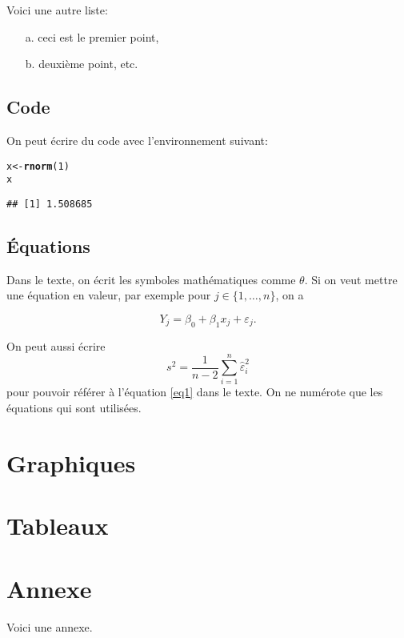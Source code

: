 \documentclass{article}\usepackage[]{graphicx}\usepackage[]{color}
\makeatletter
\newcommand{\hlnum}[1]{\textcolor[rgb]{0.686,0.059,0.569}{#1}}%
\newcommand{\hlstd}[1]{\textcolor[rgb]{0.345,0.345,0.345}{#1}}%
\newcommand{\hlkwb}[1]{\textcolor[rgb]{0.69,0.353,0.396}{#1}}%
\newcommand{\hlkwd}[1]{\textcolor[rgb]{0.737,0.353,0.396}{\textbf{#1}}}%
\newenvironment{kframe}{%
 \def\at@end@of@kframe{}%
 \ifinner\ifhmode%
  \def\at@end@of@kframe{\end{minipage}}%
  \begin{minipage}{\columnwidth}%
 \fi\fi%
 \def\FrameCommand##1{\hskip\@totalleftmargin \hskip-\fboxsep
 \colorbox{shadecolor}{##1}\hskip-\fboxsep
     \hskip-\linewidth \hskip-\@totalleftmargin \hskip\columnwidth}%
 \MakeFramed {\advance\hsize-\width
   \@totalleftmargin\z@ \linewidth\hsize
   \@setminipage}}%
 {\par\unskip\endMakeFramed%
 \at@end@of@kframe}
\newenvironment{knitrout}{}{} %
\makeatother
\begin{document}
\bigskip\noindent
Voici une autre liste:

\begin{itemize}
\item [a.] ceci est le premier point,

\item [b.] deuxième point, etc.
\end{itemize}

\subsection{Code}

On peut écrire du code avec l'environnement suivant:
\begin{knitrout}
\color{fgcolor}\begin{kframe}
\begin{alltt}
\hlstd{x} \hlkwb{<-} \hlkwd{rnorm}\hlstd{(}\hlnum{1}\hlstd{)}
\hlstd{x}
\end{alltt}
\begin{verbatim}
## [1] 1.508685
\end{verbatim}
\end{kframe}
\end{knitrout}

\subsection{Équations}

Dans le texte, on écrit les symboles mathématiques comme $\theta$. Si on veut mettre une équation en valeur, par exemple pour $j\in \{1,\ldots, n\}$, on a

$$
Y_j= \beta_0 +\beta_1 x_j +\varepsilon_j.
$$

On peut aussi écrire
\begin{equation}\label{eq1}
s^2 = \frac{1}{n-2} \sum_{i=1}^n \hat{\varepsilon}_i^2
\end{equation}
pour pouvoir référer à l'équation \ref{eq1} dans le texte. On ne numérote que les équations qui sont utilisées.



\section{Graphiques}
\label{sec:graph}


\section{Tableaux}
\label{sec:tab}


\appendix
\section{Annexe}

Voici une annexe.
\end{document}
